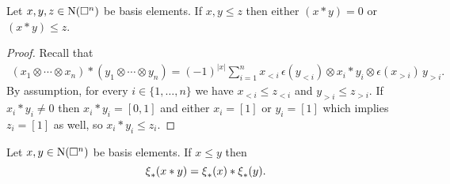 \begin{lemma}
	Let $x, y, z \in \operatorname{N}(\square^n)$ be basis elements.
	If $x, y \leq z$ then either $(x \ast y) = 0$ or $(x \ast y) \leq z$.
\end{lemma}

\begin{proof}
	Recall that
	\begin{align*}
	(x_1 \otimes \cdots \otimes x_n) \ast (y_1 \otimes \cdots \otimes y_n) =
	(-1)^{|x|} \sum_{i=1}^n x_{<i}\, \epsilon(y_{<i}) \otimes x_i \ast y_i \otimes \epsilon(x_{>i}) \, y_{>i}.
	\end{align*}
	By assumption, for every $i \in \{1, \dots, n\}$ we have $x_{<i} \leq z_{<i}$ and $y_{>i} \leq z_{>i}$.
	If $x_i \ast y_i \neq 0$ then $x_i \ast y_i = [0,1]$ and either $x_i = [1]$ or $y_i = [1]$ which implies $z_i = [1]$ as well, so $x_i \ast y_i \leq z_i$.
\end{proof}

\begin{lemma}
	Let $x, y \in \operatorname{N}(\square^n)$ be basis elements.
	If $x \leq y$ then
	\begin{equation} \label{e:cs collapse as algebra map}
	\operatorname{\xi}_\ast(x \ast y) = \operatorname{\xi}_\ast(x) \ast \operatorname{\xi}_\ast(y).
	\end{equation}
\end{lemma}

